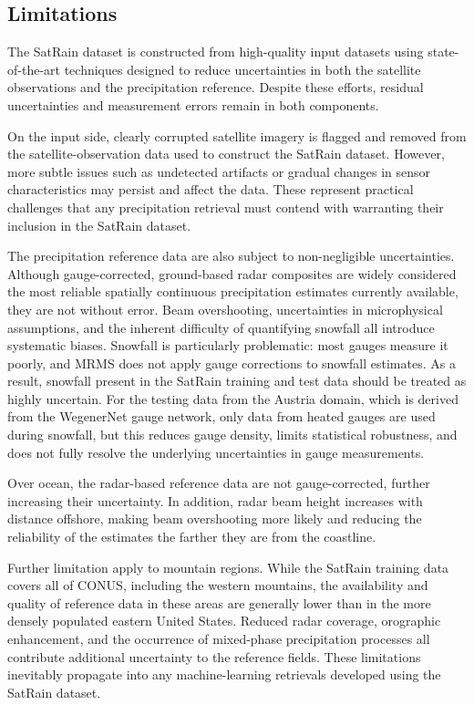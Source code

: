 \documentclass[11pt]{article}
\begin{document}
\subsection{Limitations}

The SatRain dataset is constructed from high-quality input datasets using
state-of-the-art techniques designed to reduce uncertainties in both the
satellite observations and the precipitation reference. Despite these efforts,
residual uncertainties and measurement errors remain in both components.

On the input side, clearly corrupted satellite imagery is flagged and removed
from the satellite-observation data used to construct the SatRain dataset.
However, more subtle issues such as undetected artifacts or gradual changes in
sensor characteristics may persist and affect the data. These represent
practical challenges that any precipitation retrieval must contend with
warranting their inclusion in the SatRain dataset.

The precipitation reference data are also subject to non-negligible
uncertainties. Although gauge-corrected, ground-based radar composites are
widely considered the most reliable spatially continuous precipitation estimates
currently available, they are not without error. Beam overshooting,
uncertainties in microphysical assumptions, and the inherent difficulty of
quantifying snowfall all introduce systematic biases. Snowfall is particularly
problematic: most gauges measure it poorly, and MRMS does not apply gauge
corrections to snowfall estimates. As a result, snowfall present in the SatRain
training and test data should be treated as highly uncertain. For the testing
data from the Austria domain, which is derived from the WegenerNet gauge
network, only data from heated gauges are used during snowfall, but this reduces
gauge density, limits statistical robustness, and does not fully resolve the
underlying uncertainties in gauge measurements.

Over ocean, the radar-based reference data are not gauge-corrected, further
increasing their uncertainty. In addition, radar beam height increases with
distance offshore, making beam overshooting more likely and reducing the
reliability of the estimates the farther they are from the coastline.

Further limitation apply to mountain regions. While the SatRain training data
covers all of CONUS, including the western mountains, the availability and
quality of reference data in these areas are generally lower than in the more
densely populated eastern United States. Reduced radar coverage, orographic
enhancement, and the occurrence of mixed-phase precipitation processes all
contribute additional uncertainty to the reference fields. These limitations
inevitably propagate into any machine-learning retrievals developed using the
SatRain dataset.
\end{document}
